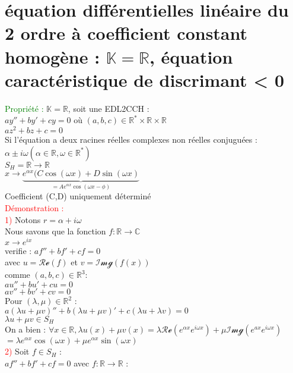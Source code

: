 \documentclass{article}
\begin{document}
	\section{équation différentielles linéaire du 2 ordre à coefficient constant homogène : $\mathbb{K} = \mathbb{R}$, équation caractéristique de discrimant < 0 }
	\textcolor{green}{Propriété :} $\mathbb{K} =\mathbb{R}$, soit une EDL2CCH : \\ 
	$ay''+by'+cy=0$ où $(a,b,c)\in \mathbb{R}^* \times \mathbb{R} \times \mathbb{R}$ \\ 
	$az^2+bz+c=0$ \\ 
	Si l'équation a deux racines réelles complexes non réelles conjuguées : \\
	$\alpha \pm i \omega (\alpha \in \mathbb{R}, \omega \in \mathbb{R}^*)$ \\ 
	$S_H= \mathbb{R} \rightarrow \mathbb{R}$ \\ 
	$x \rightarrow \underbrace{e^{\alpha x}(C \cos(\omega x) + D \sin(\omega x)}_{=A e^{\alpha x} \cos(\omega x - \phi )}$ \\
	Coefficient (C,D) uniquement déterminé \\ 
	\textcolor{red}{Démonstration :} \\ 
	\textcolor{red}{1)} Notons $r=\alpha + i \omega$ \\ 
	Nous savons que la fonction $f : \mathbb{R} \rightarrow \mathbb{C}$ \\ 
	\indent $x \rightarrow e^{ix}$ \\ 
	verifie : $af''+bf'+cf=0$ \\ 
	avec $u= \mathcal{Re}(f)$ et $v=\mathcal{Img}(f(x))$ \\ 
	comme $(a,b,c) \in \mathbb{R}^3$: \\
	$au''+bu'+cu=0$ \\ 
	$av''+bv'+cv=0$ \\ 
	Pour $(\lambda, \mu) \in \mathbb{R}^2$ : \\ 
	$a(\lambda u + \mu v)''+b(\lambda u +\mu v)'+c(\lambda u +\lambda v)=0$ \\ 
	$\lambda u +\mu v \in S_H$ \\ 
	On a bien : $\forall x \in \mathbb{R}, \lambda u(x)+\mu v(x)=\lambda \mathcal{Re}(e^{\alpha x} e^{i\omega x})+\mu \mathcal{Img}(e^{ax}e^{i \omega x})$ \\ 
	$= \lambda e^{\alpha x} \cos(\omega x)+ \mu e^{\alpha x}\sin(\omega x)$ \\ 
	\textcolor{red}{2)} Soit $f \in S_H$ : \\ 
	$af''+bf'+cf=0$ avec $f:\mathbb{R} \rightarrow \mathbb{R}$ : \\ 
\end{document}

